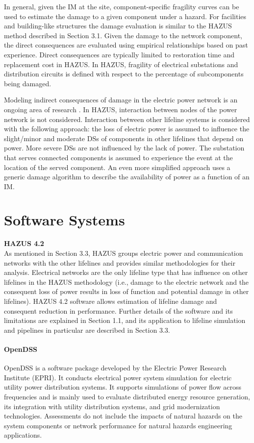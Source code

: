 In general, given the IM at the site, component-specific fragility curves can be used to estimate the damage to a given component under a hazard. For facilities and building-like structures the damage evaluation is similar to the HAZUS method described in Section 3.1. Given the damage to the network component, the direct consequences are evaluated using empirical relationships based on past experience. Direct consequences are typically limited to restoration time and replacement cost in HAZUS. In HAZUS, fragility of electrical substations and distribution circuits is defined with respect to the percentage of subcomponents being damaged.

Modeling indirect consequences of damage in the electric power network is an ongoing area of research \citep{moore2005using}. In HAZUS, interaction between nodes of the power network is not considered. Interaction between other lifeline systems is considered with the following approach: the loss of electric power is assumed to influence the slight/minor and moderate DSs of components in other lifelines that depend on power. More severe DSs are not influenced by the lack of power. The substation that serves connected components is assumed to experience the event at the location of the served component. An even more simplified approach uses a generic damage algorithm to describe the availability of power as a function of an IM. 

\section{Software Systems}
\label{sec:perf_power_tools}

\noindent\textbf{HAZUS 4.2} \\As mentioned in Section 3.3, HAZUS groups electric power and communication networks with the other lifelines and provides similar methodologies for their analysis. Electrical networks are the only lifeline type that has influence on other lifelines in the HAZUS methodology (i.e., damage to the electric network and the consequent loss of power results in loss of function and potential damage in other lifelines). HAZUS 4.2 software allows estimation of lifeline damage and consequent reduction in performance. Further details of the software and its limitations are explained in Section 1.1, and its application to lifeline simulation and pipelines in particular are described in Section 3.3.
\newline

\paragraph{OpenDSS} OpenDSS is a software package developed by the Electric Power Research Institute (EPRI). It conducts electrical power system simulation for electric utility power distribution systems. It supports simulations of power flow across frequencies and is mainly used to evaluate distributed energy resource generation, its integration with utility distribution systems, and grid modernization technologies. Assessments do not include the impacts of natural hazards on the system components or network performance for natural hazards engineering applications.
\newline

